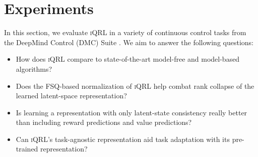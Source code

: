 \documentclass{article}
\theoremstyle{plain}
\theoremstyle{definition}
\theoremstyle{remark}
\newcommand{\our}{\textsc{iQRL}\xspace}
\begin{document}





\section{Experiments}
\label{sec:experiments}
In this section, we evaluate \our in a variety of continuous control tasks from the DeepMind Control (DMC) Suite \cite{tassa2018deepmind}.
We aim to answer the following questions:
\begin{itemize}
    \item How does \our compare to state-of-the-art model-free and model-based algorithms?
    \item Does the FSQ-based normalization of \our help combat rank collapse of the learned latent-space representation?
    \item Is learning a representation with only latent-state consistency really better than including reward predictions and value predictions?
    \item Can \our's task-agnostic representation aid task adaptation with its pre-trained representation?
\end{itemize}


\end{document}

